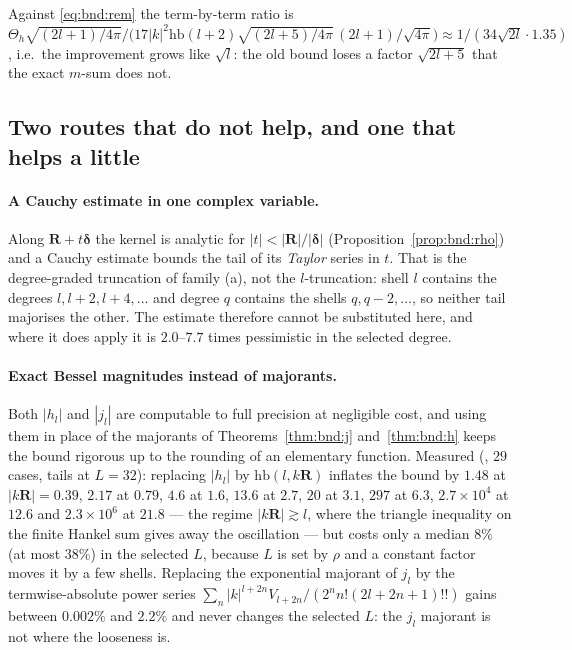 \noindent
Against \eqref{eq:bnd:rem} the term-by-term ratio is
$\Theta_h\sqrt{(2l+1)/4\pi}\big/\bigl(17|k|^2\mathrm{hb}(l+2)\sqrt{(2l+5)/4\pi}\,
(2l+1)/\sqrt{4\pi}\bigr) \approx 1/(34\sqrt{2l}\cdot 1.35)$, i.e.\ the improvement grows
like $\sqrt{l}$: the old bound loses a factor $\sqrt{2l+5}$ that the exact $m$-sum does
not.

\subsection{Two routes that do not help, and one that helps a little}
\label{sec:bnd2:routes}

\paragraph{A Cauchy estimate in one complex variable.} Along
$\mathbf{R}+t\boldsymbol{\delta}$ the kernel is analytic for $|t| < |\mathbf{R}|/
|\boldsymbol{\delta}|$ (Proposition~\ref{prop:bnd:rho}) and a Cauchy estimate bounds the
tail of its \emph{Taylor} series in $t$. That is the degree-graded truncation of family
(a), not the $l$-truncation: shell $l$ contains the degrees $l, l+2, l+4,\dots$ and degree
$q$ contains the shells $q, q-2,\dots$, so neither tail majorises the other. The estimate
therefore cannot be substituted here, and where it does apply it is $2.0$--$7.7$ times
pessimistic in the selected degree.

\paragraph{Exact Bessel magnitudes instead of majorants.} Both $|h_l|$ and $|j_l|$ are
computable to full precision at negligible cost, and using them in place of the majorants
of Theorems~\ref{thm:bnd:j} and~\ref{thm:bnd:h} keeps the bound rigorous up to the
rounding of an elementary function. Measured (, $29$ cases, tails at
$L = 32$): replacing $|h_l|$ by $\mathrm{hb}(l,k\mathbf{R})$ inflates the bound by $1.48$
at $|k\mathbf{R}| = 0.39$, $2.17$ at $0.79$, $4.6$ at $1.6$, $13.6$ at $2.7$, $20$ at $3.1$,
$297$ at $6.3$, $2.7\times10^{4}$ at $12.6$ and $2.3\times10^{6}$ at $21.8$ --- the regime
$|k\mathbf{R}| \gtrsim l$, where the triangle inequality on the finite Hankel sum gives
away the oscillation --- but costs only a median $8\%$ (at most $38\%$) in the selected
$L$, because $L$ is set by $\rho$ and a constant factor moves it by a few shells.
Replacing the exponential majorant of $j_l$ by the termwise-absolute power series
$\sum_n |k|^{l+2n}V_{l+2n}/(2^nn!(2l+2n+1)!!)$ gains between $0.002\%$ and $2.2\%$ and
never changes the selected $L$: the $j_l$ majorant is not where the looseness is.

